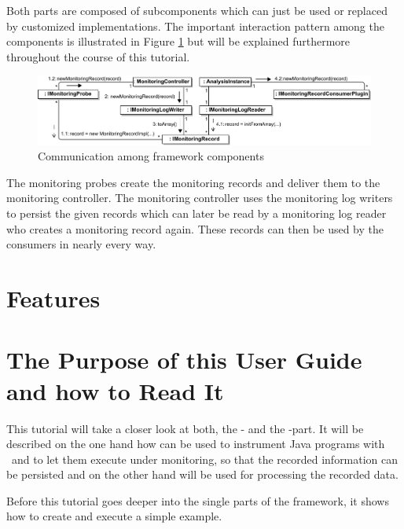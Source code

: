 \noindent Both parts are composed of subcomponents which can just be used or %
replaced by customized implementations. The important interaction pattern among %
the components is illustrated in Figure \ref{Figure:KiekerCommunicationDiagram} %
but will be explained furthermore throughout the course of this tutorial. %

\begin{figure}[H]\centering
\includegraphics[width=1\textwidth]{images/kiekerCommunications-revisedReArranged-woMonitoringLog-bw-newNames}
\caption{Communication among \Kieker{} framework components}
\label{Figure:KiekerCommunicationDiagram}
\end{figure}
		
\noindent\notify The monitoring probes create the monitoring records and deliver %
them to the monitoring controller. The monitoring controller uses the monitoring %
log writers to persist the given records which can later be read by a monitoring %
log reader who creates a monitoring record again. These records can then be used %
by the consumers in nearly every way.

\section{Features}
	
\section{The Purpose of this User Guide and how to Read It}
This tutorial will take a closer look at both, the \KiekerMonitoringPart{}- and %
the \KiekerAnalysisPart-part. It will be described on the one hand how %
\KiekerMonitoringPart{}  can be used to instrument Java programs %
with \Kieker\ and to let them execute under monitoring, so that the recorded %
information can be persisted and on the other hand \KiekerAnalysisPart{} %
will be used for processing the recorded data.

Before this tutorial goes deeper into the single parts of the framework, it %
shows how to create and execute a simple example.
